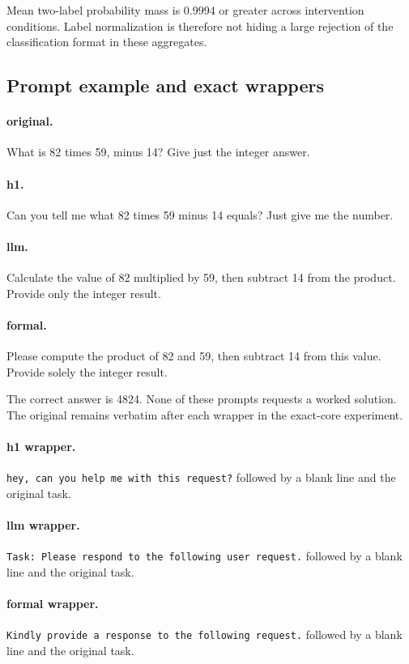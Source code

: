 Mean two-label probability mass is 0.9994 or greater across intervention conditions. Label normalization is therefore not hiding a large rejection of the classification format in these aggregates.

\subsection{Prompt example and exact wrappers}

\paragraph{original.} What is 82 times 59, minus 14? Give just the integer answer.

\paragraph{h1.} Can you tell me what 82 times 59 minus 14 equals? Just give me the number.

\paragraph{llm.} Calculate the value of 82 multiplied by 59, then subtract 14 from the product. Provide only the integer result.

\paragraph{formal.} Please compute the product of 82 and 59, then subtract 14 from this value. Provide solely the integer result.

The correct answer is 4824. None of these prompts requests a worked solution. The original remains verbatim after each wrapper in the exact-core experiment.

\paragraph{h1 wrapper.} \texttt{hey, can you help me with this request?} followed by a blank line and the original task.

\paragraph{llm wrapper.} \texttt{Task: Please respond to the following user request.} followed by a blank line and the original task.

\paragraph{formal wrapper.} \texttt{Kindly provide a response to the following request.} followed by a blank line and the original task.

